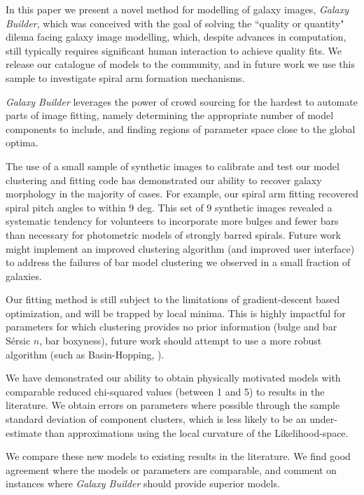 \documentclass[../main.tex]{subfiles}
\begin{document}
\label{sec:conclusions}
In this paper we present a novel method for modelling of galaxy images, \textit{Galaxy Builder}, which was conceived with the goal of solving the ``quality or quantity" dilema facing galaxy image modelling, which, despite advances in computation, still typically requires significant human interaction to achieve quality fits. We release our catalogue of models to the community, and in future work we use this sample to investigate spiral arm formation mechanisms.

\textit{Galaxy Builder} leverages the power of crowd sourcing for the hardest to automate parts of image fitting, namely determining the appropriate number of model components to include, and finding regions of parameter space close to the global optima.

The use of a small sample of synthetic images to calibrate and test our model clustering and fitting code has demonstrated our ability to recover galaxy morphology in the majority of cases. For example, our spiral arm fitting recovered spiral pitch angles to within 9 deg. This set of 9 synthetic images revealed a systematic tendency for volunteers to incorporate more bulges and fewer bars than necessary for photometric models of strongly barred spirals. Future work might implement an improved clustering algorithm (and improved user interface) to address the failures of bar model clustering we observed in a small fraction of galaxies.

Our fitting method is still subject to the limitations of gradient-descent based optimization, and will be trapped by local minima. This is highly impactful for parameters for which clustering provides no prior information (bulge and bar S\'ersic $n$, bar boxyness), future work should attempt to use a more robust algorithm (such as Basin-Hopping, \citealt{1998cond.mat..3344W}).

We have demonstrated our ability to obtain physically motivated models with comparable reduced chi-squared values (between 1 and 5) to results in the literature. We obtain errors on parameters where possible through the sample standard deviation of component clusters, which is less likely to be an under-estimate than approximations using the local curvature of the Likelihood-space.

We compare these new models to existing results in the literature. We find good agreement where the models or parameters are comparable, and comment on instances where \textit{Galaxy Builder} should provide superior models.
\end{document}
